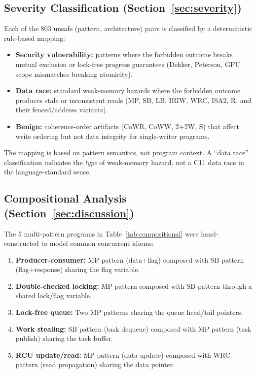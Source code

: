 \documentclass[11pt]{article}
\begin{document}
\subsection{Severity Classification (Section~\ref{sec:severity})}

Each of the 803 unsafe (pattern, architecture) pairs is classified
by a deterministic rule-based mapping:

\begin{itemize}[nosep]
\item \textbf{Security vulnerability:} patterns where the forbidden
  outcome breaks mutual exclusion or lock-free progress guarantees
  (Dekker, Peterson, GPU scope mismatches breaking atomicity).
\item \textbf{Data race:} standard weak-memory hazards where the
  forbidden outcome produces stale or inconsistent reads
  (MP, SB, LB, IRIW, WRC, ISA2, R, and their fenced/address variants).
\item \textbf{Benign:} coherence-order artifacts (CoWR, CoWW, 2+2W, S)
  that affect write ordering but not data integrity for
  single-writer programs.
\end{itemize}

\noindent
The mapping is based on pattern semantics, not program context.
A ``data race'' classification indicates the \emph{type} of
weak-memory hazard, not a C11 data race in the language-standard sense.

\subsection{Compositional Analysis (Section~\ref{sec:discussion})}

The 5 multi-pattern programs in Table~\ref{tab:compositional} were
hand-constructed to model common concurrent idioms:

\begin{enumerate}[nosep]
\item \textbf{Producer-consumer:} MP pattern (data+flag) composed with
  SB pattern (flag+response) sharing the flag variable.
\item \textbf{Double-checked locking:} MP pattern composed with SB
  pattern through a shared lock/flag variable.
\item \textbf{Lock-free queue:} Two MP patterns sharing the queue
  head/tail pointers.
\item \textbf{Work stealing:} SB pattern (task dequeue) composed with
  MP pattern (task publish) sharing the task buffer.
\item \textbf{RCU update/read:} MP pattern (data update) composed with
  WRC pattern (read propagation) sharing the data pointer.
\end{enumerate}
\end{document}
